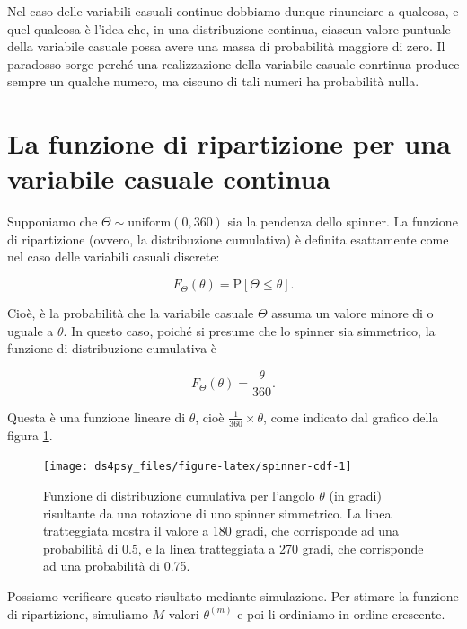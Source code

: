 \documentclass[
  11pt,
]{krantz}
\theoremstyle{definition}
\theoremstyle{definition}
\theoremstyle{definition}
\theoremstyle{definition}
\theoremstyle{remark}
\begin{document}
Nel caso delle variabili casuali continue dobbiamo dunque rinunciare a qualcosa, e quel qualcosa è l'idea che, in una distribuzione continua, ciascun valore puntuale della variabile casuale possa avere una massa di probabilità maggiore di zero. Il paradosso sorge perché una realizzazione della variabile casuale conrtinua produce sempre un qualche numero, ma ciscuno di tali numeri ha probabilità nulla.

\hypertarget{la-funzione-di-ripartizione-per-una-variabile-casuale-continua}{%
\section{La funzione di ripartizione per una variabile casuale continua}\label{la-funzione-di-ripartizione-per-una-variabile-casuale-continua}}

Supponiamo che \(\Theta \sim \mbox{uniform}(0, 360)\) sia la pendenza dello spinner. La funzione di ripartizione (ovvero, la distribuzione cumulativa) è definita esattamente come nel caso delle variabili casuali discrete:

\[
F_{\Theta}(\theta) = \mbox{P}[\Theta \leq \theta].
\]

Cioè, è la probabilità che la variabile casuale \(\Theta\) assuma un valore minore di o uguale a \(\theta\). In questo caso, poiché si presume che lo spinner sia simmetrico, la funzione di distribuzione cumulativa è

\[
F_{\Theta}(\theta) = \frac{\theta}{360}.
\]

Questa è una funzione lineare di \(\theta\), cioè \(\frac{1}{360} \times \theta\), come indicato dal grafico della figura \ref{fig:spinner-cdf}.

\begin{figure}

{\centering \texttt{[image: ds4psy\_files/figure-latex/spinner-cdf-1]} 

}

\caption{Funzione di distribuzione cumulativa per l'angolo $\theta$ (in gradi) risultante da una rotazione di uno spinner simmetrico. La linea tratteggiata mostra il valore a 180 gradi, che corrisponde ad una probabilità di 0.5, e la linea tratteggiata a 270 gradi, che corrisponde ad una probabilità di 0.75.}\label{fig:spinner-cdf}
\end{figure}

Possiamo verificare questo risultato mediante simulazione. Per stimare la funzione di ripartizione, simuliamo \(M\) valori \(\theta^{(m)}\) e poi li ordiniamo in ordine crescente.
\end{document}

